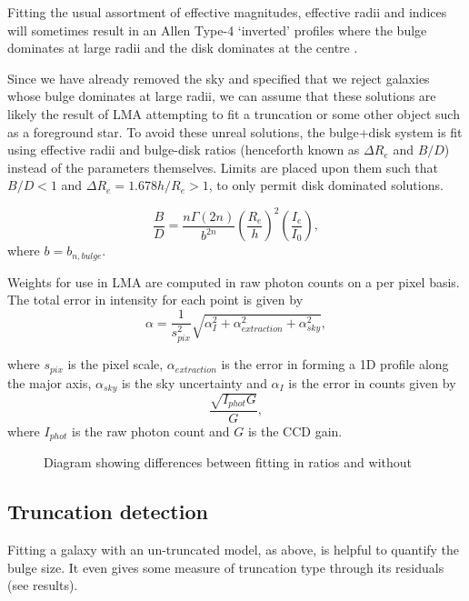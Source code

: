 Fitting the usual assortment of effective magnitudes, effective radii and \sersic indices will sometimes result in an Allen Type-4 `inverted' profiles where the bulge dominates at large radii and the disk dominates at the centre \citep{allen_millennium_2006}. 

	Since we have already removed the sky and specified that we reject galaxies whose bulge dominates at large radii, we can assume that these solutions are likely the result of LMA attempting to fit a truncation or some other object such as a foreground star. To avoid these unreal solutions, the bulge+disk system is fit using effective radii and bulge-disk ratios (henceforth known as $\Delta R_e$ and $B/D$) instead of the parameters themselves. Limits are placed upon them such that $B/D < 1$ and $\Delta R_e = 1.678 h / R_e > 1$, to only permit disk dominated solutions. 

	\begin{equation}
		\frac{B}{D} = \frac{n \Gamma(2n)}{b^{2n}}\left(\frac{R_e}{h}\right)^{2} \left(\frac{I_e}{I_0}\right),
	\end{equation}
	where $b = b_{n,bulge}$.

Weights for use in LMA are computed in raw photon counts on a per pixel basis. The total error in intensity for each point is given by 
\begin{equation}
	\alpha = \frac{1}{s_{pix}^2}\sqrt{\alpha_I^2 + \alpha_{extraction}^2 + \alpha_{sky}^2},
\end{equation}

where $s_{pix}$ is the pixel scale, $\alpha_{extraction}$ is the error in forming a 1D profile along the major axis, $\alpha_{sky}$ is the sky uncertainty and $\alpha_I$ is the error in counts given by 
\begin{equation}
	\frac{\sqrt{I_{phot}G}}{G},
\end{equation}
where $I_{phot}$ is the raw photon count and $G$ is the CCD gain.

\begin{figure}
	\caption{Diagram showing differences between fitting in ratios and without}
\end{figure}

\subsection{Truncation detection}
Fitting a galaxy with an un-truncated model, as above, is helpful to quantify the bulge size. It even gives some measure of truncation type through its residuals (see results). 

